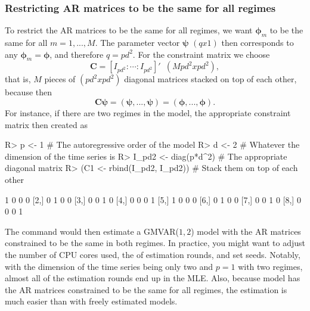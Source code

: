 \documentclass[nojss]{jss}
\begin{document}
\subsubsection{Restricting AR matrices to be the same for all regimes}
To restrict the AR matrices to be the same for all regimes, we want $\boldsymbol{\phi}_m$ to be the same for all $m=1,...,M$. The parameter vector $\boldsymbol{\psi}$ $(qx1)$ then corresponds to any $\boldsymbol{\phi}_m=\boldsymbol{\phi}$, and therefore $q=pd^2$. For the constraint matrix we choose
\begin{equation}
\boldsymbol{C} = [I_{pd^2}:\cdots:I_{pd^2}]' \enspace (Mpd^2xpd^2),
\end{equation}
that is, $M$ pieces of $(pd^2xpd^2)$ diagonal matrices stacked on top of each other, because then
\begin{equation}
\boldsymbol{C}\boldsymbol{\psi}=(\boldsymbol{\psi},...,\boldsymbol{\psi})=(\boldsymbol{\phi},...,\boldsymbol{\phi}).
\end{equation}
For instance, if there are two regimes in the model, the appropriate constraint matrix then created as
%
\begin{CodeChunk}
\begin{CodeInput}
R> p <- 1 # The autoregressive order of the model
R> d <- 2 # Whatever the dimension of the time series is
R> I_pd2 <- diag(p*d^2) # The appropriate diagonal matrix
R> (C1 <- rbind(I_pd2, I_pd2)) # Stack them on top of each other
\end{CodeInput}
\begin{CodeOutput}
     [,1] [,2] [,3] [,4]
[1,]    1    0    0    0
[2,]    0    1    0    0
[3,]    0    0    1    0
[4,]    0    0    0    1
[5,]    1    0    0    0
[6,]    0    1    0    0
[7,]    0    0    1    0
[8,]    0    0    0    1
\end{CodeOutput}
\end{CodeChunk}
%
The command  would then estimate a GMVAR($1,2$) model with the AR matrices constrained to be the same in both regimes. In practice, you might want to adjust the number of CPU cores used, the of estimation rounds, and set seeds. Notably, with the dimension of the time series being only two and $p=1$ with two regimes, almost all of the estimation rounds end up in the MLE. Also, because model has the AR matrices constrained to be the same for all regimes, the estimation is much easier than with freely estimated models.
\end{document}
